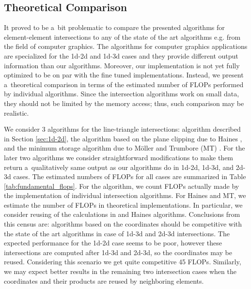 \subsection{Theoretical Comparison}
It proved to be a~bit problematic to compare the presented algorithms for element-element intersections to any of the state of the art
algorithms e.g. from the field of computer graphics. The algorithms for computer graphics applications are specialized for
the 1d-2d and 1d-3d cases and they provide different output information than our algorithms. Moreover, our implementation 
is not yet fully optimized to be on par with the fine tuned implementations. Instead, we present a~theoretical comparison 
in terms of the estimated number of FLOPs performed by individual algorithms. Since the intersection 
algorithms work on small data, they should not be limited by the memory access; thus, such comparison may be realistic. 

We consider 3 algorithms for the line-triangle intersections: \plucker algorithm 
described in Section \ref{sec:1d-2d}, the algorithm based on the plane clipping due to Haines \cite{haines_fast_1991}, and the minimum storage
algorithm due to M{\" o}ller and Trumbore (MT) \cite{moller_fast_1997}. For the later two algorithms we consider straightforward modifications
to make them return a~qualitatively same output as our algorithms do in 1d-2d, 1d-3d, and 2d-3d cases.
The estimated numbers of FLOPs for all cases are summarized in Table \ref{tab:fundamental_flops}.
For the \plucker algorithm, we count FLOPs actually made by the implementation of individual intersection algorithms. For Haines and MT, 
we estimate the number of FLOPs in theoretical implementations. In particular, we consider reusing of the calculations in \plucker and Haines algorithms. 
Conclusions from this census are: algorithms based on the \plucker coordinates should be competitive with the state of the art algorithms in case of 1d-3d 
and 2d-3d intersections. The expected performance for the 1d-2d case seems to be poor, however these intersections are computed after 1d-3d and 2d-3d,
so the \plucker coordinates may be reused. Considering this scenario we get quite competitive 45 FLOPs. 
Similarly, we may expect better results in the remaining two intersection cases when the \plucker coordinates and their products 
are reused by neighboring elements.


